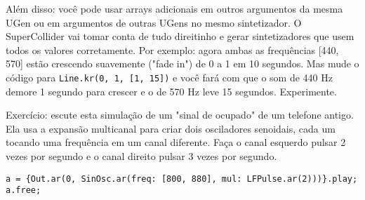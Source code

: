 Além disso: você pode usar arrays adicionais em outros argumentos da mesma UGen ou em argumentos de outras UGens no mesmo sintetizador. O SuperCollider vai tomar conta de tudo direitinho e gerar sintetizadores que usem todos os valores corretamente. Por exemplo: agora ambas as frequências [440, 570] estão crescendo suavemente ("fade in") de 0 a 1 em 10 segundos. Mas mude o código para \texttt{Line.kr(0, 1, [1, 15])} e você fará com que o som de 440 Hz demore 1 segundo para crescer e o de 570 Hz leve 15 segundos. Experimente.

Exercício: escute esta simulação de um "sinal de ocupado" de um telefone antigo. Ela usa a expansão multicanal para criar dois osciladores senoidais, cada um tocando uma frequência em um canal diferente. Faça o canal esquerdo pulsar 2 vezes por segundo e o canal direito pulsar 3 vezes por segundo.

\medskip
\begin{lstlisting}[style=SuperCollider-IDE, basicstyle=\scttfamily\footnotesize]
a = {Out.ar(0, SinOsc.ar(freq: [800, 880], mul: LFPulse.ar(2)))}.play;
a.free;
\end{lstlisting}
